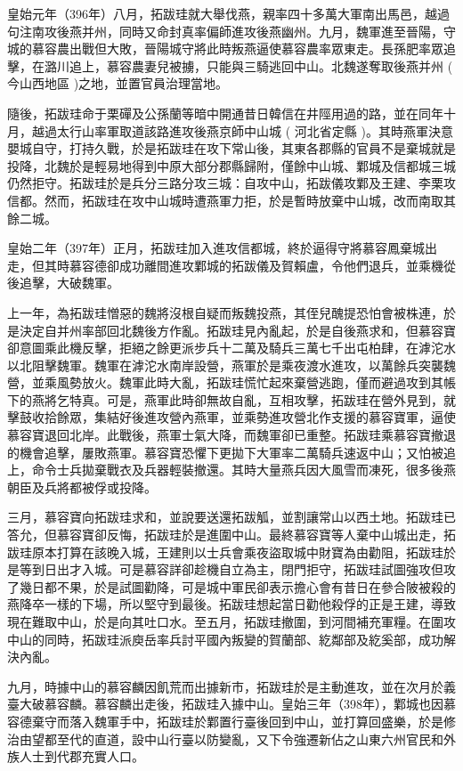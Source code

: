 皇始元年（396年）八月，拓跋珪就大舉伐燕，親率四十多萬大軍南出馬邑，越過句注南攻後燕并州，同時又命封真率偏師進攻後燕幽州。九月，魏軍進至晉陽，守城的慕容農出戰但大敗，晉陽城守將此時叛燕逼使慕容農率眾東走。長孫肥率眾追擊，在潞川追上，慕容農妻兒被擄，只能與三騎逃回中山。北魏遂奪取後燕并州 ( 今山西地區 )之地，並置官員治理當地。

隨後，拓跋珪命于栗磾及公孫蘭等暗中開通昔日韓信在井陘用過的路，並在同年十月，越過太行山率軍取道該路進攻後燕京師中山城 ( 河北省定縣 )。其時燕軍決意嬰城自守，打持久戰，於是拓跋珪在攻下常山後，其東各郡縣的官員不是棄城就是投降，北魏於是輕易地得到中原大部分郡縣歸附，僅餘中山城、鄴城及信都城三城仍然拒守。拓跋珪於是兵分三路分攻三城：自攻中山，拓跋儀攻鄴及王建、李栗攻信都。然而，拓跋珪在攻中山城時遭燕軍力拒，於是暫時放棄中山城，改而南取其餘二城。

皇始二年（397年）正月，拓跋珪加入進攻信都城，終於逼得守將慕容鳳棄城出走，但其時慕容德卻成功離間進攻鄴城的拓跋儀及賀賴盧，令他們退兵，並乘機從後追擊，大破魏軍。

上一年，為拓跋珪憎惡的魏將沒根自疑而叛魏投燕，其侄兒醜提恐怕會被株連，於是決定自并州率部回北魏後方作亂。拓跋珪見內亂起，於是自後燕求和，但慕容寶卻意圖乘此機反擊，拒絕之餘更派步兵十二萬及騎兵三萬七千出屯柏肆，在滹沱水以北阻擊魏軍。魏軍在滹沱水南岸設營，燕軍於是乘夜渡水進攻，以萬餘兵突襲魏營，並乘風勢放火。魏軍此時大亂，拓跋珪慌忙起來棄營逃跑，僅而避過攻到其帳下的燕將乞特真。可是，燕軍此時卻無故自亂，互相攻擊，拓跋珪在營外見到，就擊鼓收拾餘眾，集結好後進攻營內燕軍，並乘勢進攻營北作支援的慕容寶軍，逼使慕容寶退回北岸。此戰後，燕軍士氣大降，而魏軍卻已重整。拓跋珪乘慕容寶撤退的機會追擊，屢敗燕軍。慕容寶恐懼下更拋下大軍率二萬騎兵速返中山；又怕被追上，命令士兵拋棄戰衣及兵器輕裝撤還。其時大量燕兵因大風雪而凍死，很多後燕朝臣及兵將都被俘或投降。

三月，慕容寶向拓跋珪求和，並說要送還拓跋觚，並割讓常山以西土地。拓跋珪已答允，但慕容寶卻反悔，拓跋珪於是進圍中山。最終慕容寶等人棄中山城出走，拓跋珪原本打算在該晚入城，王建則以士兵會乘夜盜取城中財寶為由勸阻，拓跋珪於是等到日出才入城。可是慕容詳卻趁機自立為主，閉門拒守，拓跋珪試圖強攻但攻了幾日都不果，於是試圖勸降，可是城中軍民卻表示擔心會有昔日在參合陂被殺的燕降卒一樣的下場，所以堅守到最後。拓跋珪想起當日勸他殺俘的正是王建，導致現在難取中山，於是向其吐口水。至五月，拓跋珪撤圍，到河間補充軍糧。在圍攻中山的同時，拓跋珪派庾岳率兵討平國內叛變的賀蘭部、紇鄰部及紇奚部，成功解決內亂。

九月，時據中山的慕容麟因飢荒而出據新市，拓跋珪於是主動進攻，並在次月於義臺大破慕容麟。慕容麟出走後，拓跋珪入據中山。皇始三年（398年），鄴城也因慕容德棄守而落入魏軍手中，拓跋珪於鄴置行臺後回到中山，並打算回盛樂，於是修治由望都至代的直道，設中山行臺以防變亂，又下令強遷新佔之山東六州官民和外族人士到代郡充實人口。

